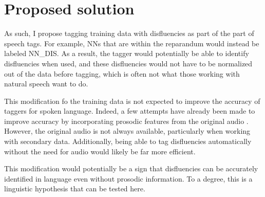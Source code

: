 \documentclass{article}
\begin{document}
  \section{Proposed solution}
    As such, I propose tagging training data with disfluencies as part of the part of speech tags.
    For example, NNs that are within the reparandum would instead be labeled NN\_DIS.
    As a result, the tagger would potentially be able to identify disfluencies when used, and these disfluencies would not have to be normalized out of the data before tagging, which is often not what those working with natural speech want to do.

    This modification fo the training data is not expected to improve the accuracy of taggers for spoken language.
    Indeed, a few attempts have already been made to improve accuracy by incorporating prosodic features from the original audio \parencite[e.g.,][]{christodoulides_dismo:_2018}.
    However, the original audio is not always available, particularly when working with secondary data.
    Additionally, being able to tag disfluencies automatically without the need for audio would likely be far more efficient.

    This modification would potentially be a sign that disfluencies can be accurately identified in language even without prosodic information.
    To a degree, this is a linguistic hypothesis that can be tested here.


  \printbibliography
\end{document}
